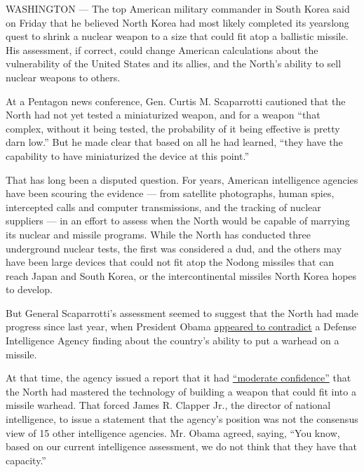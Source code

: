 WASHINGTON --- The top American military commander in South Korea said
on Friday that he believed North Korea had most likely completed its
yearslong quest to shrink a nuclear weapon to a size that could fit atop
a ballistic missile. His assessment, if correct, could change American
calculations about the vulnerability of the United States and its
allies, and the North's ability to sell nuclear weapons to others.

At a Pentagon news conference, Gen. Curtis M. Scaparrotti cautioned that
the North had not yet tested a miniaturized weapon, and for a weapon
``that complex, without it being tested, the probability of it being
effective is pretty darn low.'' But he made clear that based on all he
had learned, ``they have the capability to have miniaturized the device
at this point.''

That has long been a disputed question. For years, American intelligence
agencies have been scouring the evidence --- from satellite photographs,
human spies, intercepted calls and computer transmissions, and the
tracking of nuclear suppliers --- in an effort to assess when the North
would be capable of marrying its nuclear and missile programs. While the
North has conducted three underground nuclear tests, the first was
considered a dud, and the others may have been large devices that could
not fit atop the Nodong missiles that can reach Japan and South Korea,
or the intercontinental missiles North Korea hopes to develop.

But General Scaparrotti's assessment seemed to suggest that the North
had made progress since last year, when President Obama
\href{http://www.nytimes.com/2013/04/17/us/politics/obama-voices-doubts-on-north-korean-nuclear-warhead.html?_r=0\&pagewanted=print}{appeared
to contradict} a Defense Intelligence Agency finding about the country's
ability to put a warhead on a missile.

At that time, the agency issued a report that it had
\href{http://www.nytimes.com/2013/04/12/world/asia/north-korea-may-have-nuclear-missile-capability-us-agency-says.html?pagewanted=all\&module=Search\&mabReward=relbias\%3As\%2C\%7B\%221\%22\%3A\%22RI\%3A8\%22\%7D}{``moderate
confidence''} that the North had mastered the technology of building a
weapon that could fit into a missile warhead. That forced James R.
Clapper Jr., the director of national intelligence, to issue a statement
that the agency's position was not the consensus view of 15 other
intelligence agencies. Mr. Obama agreed, saying, ``You know, based on
our current intelligence assessment, we do not think that they have that
capacity.''

